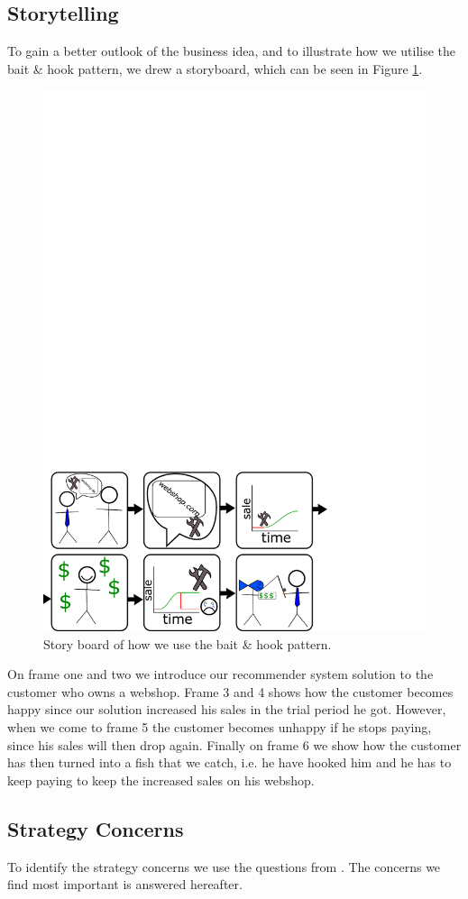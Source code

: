 \subsection{Storytelling}
To gain a better outlook of the business idea, and to illustrate how we utilise the bait \& hook pattern, we drew a storyboard, which can be seen in Figure \cref{fig:drawing}.

\begin{figure}
	\centering
	\includegraphics[width=0.7\linewidth]{figures/drawing}
	\caption{Story board of how we use the bait \& hook pattern.}
	\label{fig:drawing}
\end{figure}
 
 On frame one and two we introduce our recommender system solution to the customer who owns a webshop.
 Frame 3 and 4 shows how the customer becomes happy since our solution increased his sales in the trial period he got.
 However, when we come to frame 5 the customer becomes unhappy if he stops paying, since his sales will then drop again.
 Finally on frame 6 we show how the customer has then turned into a fish that we catch, i.e. he have hooked him and he has to keep paying to keep the increased sales on his webshop.
 
\subsection{Strategy Concerns}
To identify the strategy concerns we use the questions from \citep[pg. 202-208]{osterwalder2010business}.
The concerns we find most important is answered hereafter.

